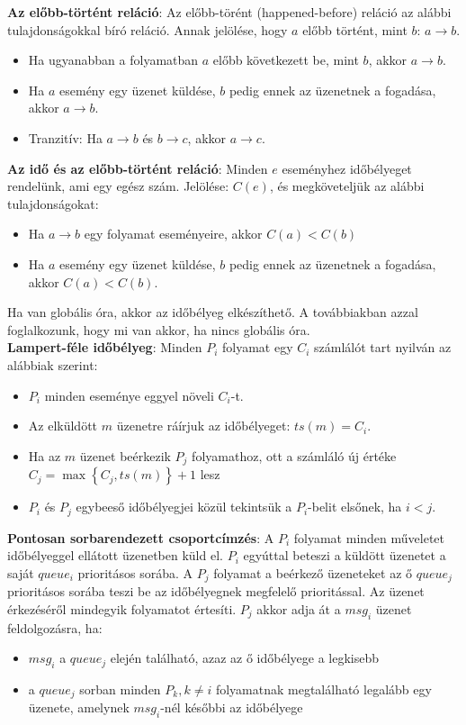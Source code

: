 \documentclass[margin=0px]{article}
\begin{document}
	\noindent \textbf{Az előbb-történt reláció}: Az előbb-törént (happened-before) reláció az alábbi tulajdonságokkal bíró reláció.
	Annak jelölése, hogy $a$ előbb történt, mint $b$: $a \to b$.
	
	\begin{itemize}
		\item	Ha ugyanabban a folyamatban $a$ előbb következett be, mint $b$, akkor $a \to b$.
		\item	Ha $a$ esemény egy üzenet küldése, $b$ pedig ennek az üzenetnek a fogadása, akkor $a \to b$.
		\item	Tranzitív: Ha $a \to b$ és $b \to c$, akkor $a \to c$.
	\end{itemize}
	
	\noindent \textbf{Az idő és az előbb-történt reláció}: Minden $e$ eseményhez időbélyeget rendelünk, ami egy egész szám. Jelölése:
	$C(e)$, és megköveteljük az alábbi tulajdonságokat:
	
	\begin{itemize}
		\item	Ha $a \to b$ egy folyamat eseményeire, akkor $C(a)<C(b)$
		\item	Ha $a$ esemény egy üzenet küldése, $b$ pedig ennek az üzenetnek a fogadása, akkor $C(a)<C(b)$.
	\end{itemize}
	
	Ha van globális óra, akkor az időbélyeg elkészíthető. A továbbiakban azzal foglalkozunk, hogy mi van akkor, ha nincs globális
	óra.\\
	
	\noindent \textbf{Lampert-féle időbélyeg}: Minden $P_{i}$ folyamat egy $C_{i}$ számlálót tart nyilván az alábbiak szerint:
	\begin{itemize}
		\item	$P_{i}$ minden eseménye eggyel növeli $C_{i}$-t.
		\item	Az elküldött $m$ üzenetre ráírjuk az időbélyeget: $ts(m) = C_{i}$.
		\item	Ha az $m$ üzenet beérkezik $P_{j}$ folyamathoz, ott a számláló új értéke
		$C_{j} = \max \left\{C_{j},ts(m)\right\}+1$ lesz
		\item	$P_{i}$ és $P_{j}$ egybeeső időbélyegjei közül tekintsük a $P_{i}$-belit elsőnek, ha $i<j$.
	\end{itemize}
	
	\noindent \textbf{Pontosan sorbarendezett csoportcímzés}: A $P_{i}$ folyamat minden műveletet időbélyeggel ellátott
	üzenetben küld el. $P_{i}$ egyúttal beteszi a küldött üzenetet a saját $queue_{i}$ prioritásos sorába. A $P_{j}$
	folyamat a beérkező üzeneteket az ő $queue_{j}$ prioritásos sorába teszi be az időbélyegnek megfelelő prioritással.
	Az üzenet érkezéséről mindegyik folyamatot értesíti.
	$P_{j}$ akkor adja át a $msg_{i}$ üzenet feldolgozásra, ha:
	\begin{itemize}
		\item	$msg_{i}$ a $queue_{j}$ elején található, azaz az ő időbélyege a legkisebb
		\item	a $queue_{j}$ sorban minden $P_{k}, k \not = i$ folyamatnak megtalálható legalább egy üzenete, amelynek
		$msg_{i}$-nél későbbi az időbélyege

	\end{itemize}
	
\end{document}
